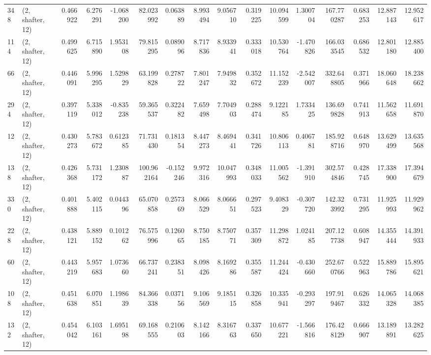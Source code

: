 \begin{tabular}{llrrrrrrrrrrrrrr}
348 &  (2, shafter, 12) &   0.466922 &   6.276291 &  -1.068200 &    82.023992 &   0.063889 &   8.993494 &   9.056710 &  0.319225 &  10.094599 &   1.300704 &   167.770287 &  0.683253 &  12.887143 &  12.952617 \\
114 &  (2, shafter, 12) &   0.499625 &   6.715890 &   1.953108 &    79.815295 &   0.089096 &   8.717836 &   8.933941 &  0.333018 &  10.530764 &  -1.470826 &   166.033545 &  0.686532 &  12.801180 &  12.885400 \\
66  &  (2, shafter, 12) &   0.446091 &   5.996295 &   1.529829 &    63.199828 &   0.278722 &   7.801247 &   7.949832 &  0.352672 &  11.152239 &  -2.542007 &   332.648805 &  0.371966 &  18.060648 &  18.238662 \\
294 &  (2, shafter, 12) &   0.397119 &   5.338012 &  -0.835238 &    59.365537 &   0.322482 &   7.659498 &   7.704903 &  0.288474 &   9.122185 &   1.733425 &   136.699828 &  0.741913 &  11.562658 &  11.691870 \\
12  &  (2, shafter, 12) &   0.430273 &   5.783672 &   0.612385 &    71.731430 &   0.181354 &   8.447273 &   8.469441 &  0.341726 &  10.806113 &   0.406781 &   185.928716 &  0.648970 &  13.629499 &  13.635568 \\
138 &  (2, shafter, 12) &   0.426368 &   5.731172 &   1.230887 &   100.962164 &  -0.152246 &   9.972316 &  10.047993 &  0.348033 &  11.005562 &  -1.391910 &   302.574846 &  0.428745 &  17.338900 &  17.394679 \\
330 &  (2, shafter, 12) &   0.401888 &   5.402115 &   0.044396 &    65.070858 &   0.257369 &   8.066529 &   8.066651 &  0.297523 &   9.408329 &  -0.307720 &   142.323992 &  0.731295 &  11.925993 &  11.929962 \\
228 &  (2, shafter, 12) &   0.438121 &   5.889152 &   0.101262 &    76.575996 &   0.126065 &   8.750185 &   8.750771 &  0.357309 &  11.298872 &   1.024185 &   207.127738 &  0.608947 &  14.355444 &  14.391933 \\
60  &  (2, shafter, 12) &   0.443219 &   5.957683 &   1.073660 &    66.737241 &   0.238351 &   8.098426 &   8.169286 &  0.355587 &  11.244424 &  -0.430660 &   252.670766 &  0.522963 &  15.889786 &  15.895621 \\
108 &  (2, shafter, 12) &   0.451638 &   6.070851 &   1.198639 &    84.366338 &   0.037156 &   9.106569 &   9.185115 &  0.326858 &  10.335941 &  -0.293297 &   197.919467 &  0.626332 &  14.065328 &  14.068385 \\
132 &  (2, shafter, 12) &   0.454042 &   6.103161 &   1.695198 &    69.168555 &   0.210603 &   8.142166 &   8.316763 &  0.337650 &  10.677221 &  -1.566816 &   176.428129 &  0.666907 &  13.189891 &  13.282625 \\

\end{tabular}
